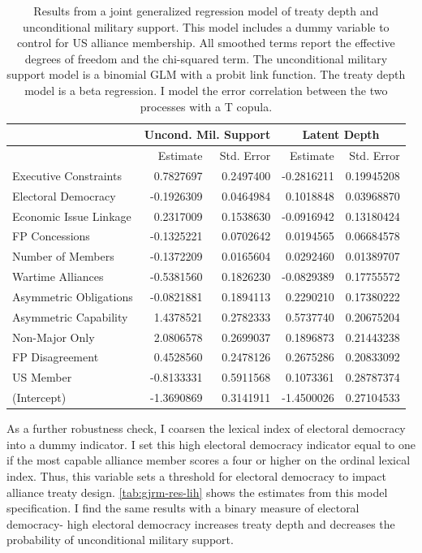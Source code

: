 \documentclass[12pt]{article}
\begin{document}
\begin{table}[ht]
\centering
\begin{tabular}{lrrrr}
  & \multicolumn{2}{c}{Uncond. Mil. Support} & \multicolumn{2}{c}{Latent Depth}\\ \hline
 & Estimate & Std. Error & Estimate & Std. Error \\ 
  \hline
  Executive Constraints & 0.7827697 & 0.2497400 & -0.2816211 & 0.19945208 \\ 
  Electoral Democracy & -0.1926309 & 0.0464984 & 0.1018848 & 0.03968870 \\ 
  Economic Issue Linkage & 0.2317009 & 0.1538630 & -0.0916942 & 0.13180424 \\ 
  FP Concessions & -0.1325221 & 0.0702642 & 0.0194565 & 0.06684578 \\ 
  Number of Members & -0.1372209 & 0.0165604 & 0.0292460 & 0.01389707 \\ 
  Wartime Alliances & -0.5381560 & 0.1826230 & -0.0829389 & 0.17755572 \\ 
  Asymmetric Obligations & -0.0821881 & 0.1894113 & 0.2290210 & 0.17380222 \\ 
  Asymmetric Capability & 1.4378521 & 0.2782333 & 0.5737740 & 0.20675204 \\ 
  Non-Major Only & 2.0806578 & 0.2699037 & 0.1896873 & 0.21443238 \\ 
  FP Disagreement & 0.4528560 & 0.2478126 & 0.2675286 & 0.20833092 \\ 
  US Member & -0.8133331 & 0.5911568 & 0.1073361 & 0.28787374 \\ 
  (Intercept) & -1.3690869 & 0.3141911 & -1.4500026 & 0.27104533 \\ 
   \hline
\end{tabular}
\caption{Results from a joint generalized regression model of treaty depth and unconditional military support. 
                     This model includes a dummy variable to control for US alliance membership.
                     All smoothed terms report the effective degrees of freedom and the chi-squared term. 
                     The unconditional military support model is a binomial GLM with a probit link function. 
                     The treaty depth model is a beta regression. 
                     I model the error correlation between the two processes with a T copula.} 
\label{tab:gjrm-res-us}
\end{table}


As a further robustness check, I coarsen the lexical index of electoral democracy into a dummy indicator. 
I set this high electoral democracy indicator equal to one if the most capable alliance member scores a four or higher on the ordinal lexical index. 
Thus, this variable sets a threshold for electoral democracy to impact alliance treaty design. 
\autoref{tab:gjrm-res-lih} shows the estimates from this model specification. 
I find the same results with a binary measure of electoral democracy- high electoral democracy increases treaty depth and decreases the probability of unconditional military support. 
\end{document}
